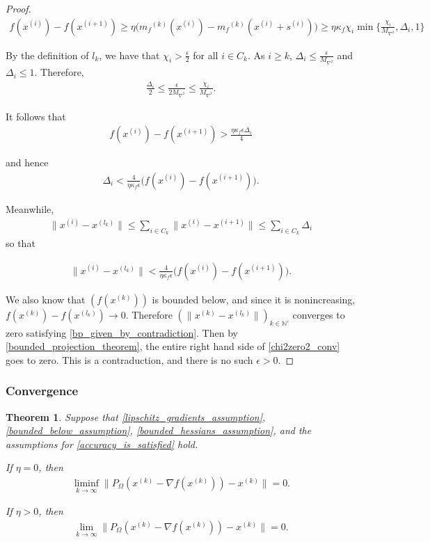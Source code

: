 \documentclass{article}
\newtheorem{theorem}{Theorem}[section]
\theoremstyle{case}
\numberwithin{theorem}{subsection}
\newcommand{\gradf}{\nabla f}
\newcommand{\maxhessian}{{M_{\nabla^2}}}
\newcommand{\mfk}{{{m}_f}^{(k)}}
\newcommand{\naturals}{\mathbb N}
\newcommand{\xk}{{x^{(k)}}}
\begin{document}
\begin{proof}
\begin{align*}
f(x^{(i)}) - f(x^{(i+1)}) \ge \eta\big ( \mfk(x^{(i)}) - \mfk(x^{(i)} + s^{(i)}) \big ) \ge \eta \kappa_f \chi_i \min\{\frac{\chi_{i}}{\maxhessian}, \Delta_i, 1\} 
\end{align*}

By the definition of $l_k$, we have that $\chi_i > \frac{\epsilon}{2}$ for all $i \in C_k$.
As $i \ge k$, $\Delta_i \le \frac{\epsilon}{\maxhessian}$ and $\Delta_i \le 1$.
Therefore,
\begin{align*}
\frac{\Delta_i}{2} \le \frac{\epsilon}{2 \maxhessian} \le \frac{\chi_i}{\maxhessian}.
\end{align*}

It follows that
\begin{align*}
f(x^{(i)}) - f(x^{(i+1)}) > \frac{\eta \kappa_f \epsilon \Delta_i}{4}
\end{align*}

and hence
\begin{align*}
\Delta_i < \frac{4}{\eta \kappa_f \epsilon} \big ( f(x^{(i)}) - f(x^{(i+1)})\big ).
\end{align*}

Meanwhile,
\begin{align*}
\|x^{(i)} - x^{(l_k)}\| \le \sum_{i \in C_k}\|x^{(i)} - x^{(i+1)}\| \le \sum_{i \in C_k} \Delta_i
\end{align*}
so that

\begin{align}
\|x^{(i)} - x^{(l_k)}\| < \frac{4}{\eta \kappa_f \epsilon} \big ( f(x^{(i)}) - f(x^{(i+1)})\big ).
\end{align}

We also know that $(f(\xk))$ is bounded below, and since it is nonincreasing, $f(\xk)  - f(x^{(l_k)}) \to 0$.
Therefore $(\|\xk - x^{(l_k)}\|)_{k \in \naturals '}$ converges to zero satisfying \cref{bp_given_by_contradiction}.
Then by \cref{bounded_projection_theorem}, the entire right hand side of \cref{chi2zero2_conv} goes to zero.
This is a contraduction, and there is no such $\epsilon > 0$.
\end{proof}

\subsubsection{Convergence}

\begin{theorem}
\label{the_convergence_theorem}
Suppose that \cref{lipschitz_gradients_assumption}, \cref{bounded_below_assumption}, \cref{bounded_hessians_assumption}, and 
the assumptions for \cref{accuracy_is_satisfied} hold.

If $\eta = 0$, then
\begin{align}
\liminf_{k\to\infty} \|P_{\Omega}(\xk - \gradf(\xk)) - \xk \| = 0.
\end{align}

If $\eta > 0$, then
\begin{align}
\lim_{k\to\infty} \|P_{\Omega}(\xk - \gradf(\xk)) - \xk \| = 0.
\end{align}

\end{theorem}
\end{document}
